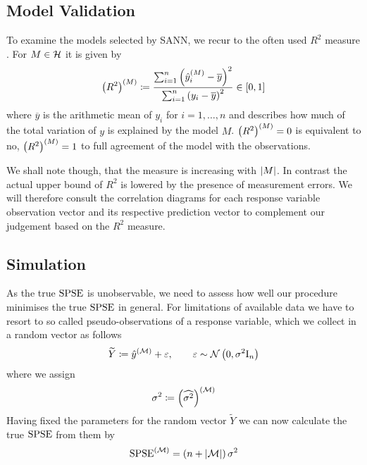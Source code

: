 		\medskip
		\begin{tcolorbox}[colframe=black,colbacktitle=white,coltitle=black, attach boxed title to top center={yshift=-2mm},enhanced, titlerule=0.1pt, boxrule=0.5pt, arc=5pt,title=Listing:\quad SANN algorithm]
			
		\end{tcolorbox}
		\medskip

		
	\subsection{Model Validation}
	\label{ssec:model-validation}
	
		To examine the models selected by SANN, we recur to the often used $R^2$ measure \cite[33-4]{draper:98a}.
		For $M\in\mathcal{H}$ it is given by
		\[
			\left( R^2 \right)^{(M)} \coloneqq \frac {\sum_{i=1}^n \left( \hat{y}^{(M)}_i - \overline{y} \right)^2}{\sum_{i=1}^n \left( y_i - \overline{y} \right)^2} \in [0,1]
		\]
		where $\overline{y}$ is the arithmetic mean of $y_i$ for $i=1,\ldots,n$ and describes how much of the total variation of $y$ is explained by the model $M$.
		$\left( R^2 \right)^{(M)} = 0$ is equivalent to no, $\left( R^2 \right)^{(M)} = 1$ to full agreement of the model with the observations.
		
		We shall note though, that the measure is increasing with $\left\vert M \right\vert$.
		In contrast the actual upper bound of $R^2$ is lowered by the presence of measurement errors.
		We will therefore consult the correlation diagrams for each response variable observation vector and its respective prediction vector to complement our judgement based on the $R^2$ measure.

	
	\subsection{Simulation}
	\label{ssec:simulation}
	
		As the true $\mathrm{SPSE}$ is unobservable, we need to assess how well our procedure minimises the true $\mathrm{SPSE}$ in general.
		For limitations of available data we have to resort to so called pseudo-observations of a response variable, which we collect in a random vector as follows
		\[
			\widetilde{Y} \coloneqq \hat{y}^{(\mathcal{M})} + \varepsilon,\qquad \varepsilon \sim  \mathcal{N} \left( 0,\sigma^2\mathrm{I}_n \right)
		\]
		where we assign
		\[
			\sigma^2 \coloneqq \left( \widehat{\sigma^2} \right)^{(\mathcal{M})}
		\]
		Having fixed the parameters for the random vector $\widetilde{Y}$ we can now calculate the true $\mathrm{SPSE}$ from them by
		\[
			\mathrm{SPSE}^{(\mathcal{M})} = \left(  n + \left\vert \mathcal{M} \right\vert  \right) \sigma^2
		\]
		
